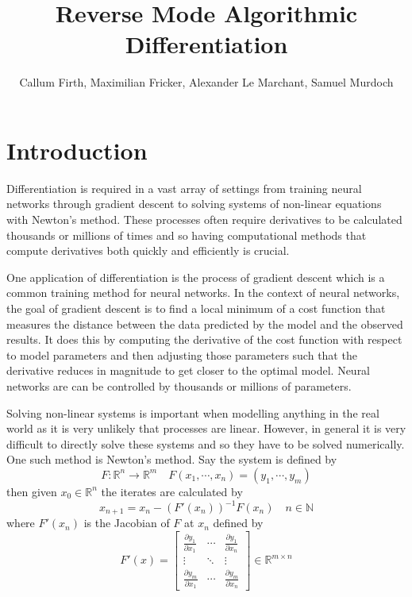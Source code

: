 \documentclass{article}
\title{Reverse Mode Algorithmic Differentiation}
\author{Callum Firth, Maximilian Fricker, Alexander Le Marchant, Samuel Murdoch} %
\date{}
\begin{document}
\maketitle

\tableofcontents
\newpage

\section{Introduction}

Differentiation is required in a vast array of settings from training neural networks through gradient descent to solving systems of non-linear equations with Newton's method. These processes often require derivatives to be calculated thousands or millions of times and so having computational methods that compute derivatives both quickly and efficiently is crucial.

One application of differentiation is the process of gradient descent which is a common training method for neural networks. In the context of neural networks, the goal of gradient descent is to find a local minimum of a cost function that measures the distance between the data predicted by the model and the observed results. It does this by computing the derivative of the cost function with respect to model parameters and then adjusting those parameters such that the derivative reduces in magnitude to get closer to the optimal model. Neural networks are can be controlled by thousands or millions of parameters.

Solving non-linear systems is important when modelling anything in the real world as it is very unlikely that processes are linear. However, in general it is very difficult to directly solve these systems and so they have to be solved numerically. One such method is Newton's method. Say the system is defined by
\begin{equation} \label{Fxy}
        F: \mathbb{R}^n \rightarrow \mathbb{R}^m \quad F(x_1, \cdots, x_n) = (y_1, \cdots, y_m)
\end{equation}
then given $x_0 \in \mathbb{R}^n$ the iterates are calculated by
\begin{equation*}
x_{n+1} = x_n - (F'(x_n))^{-1}F(x_n) \quad n \in \mathbb{N}
\end{equation*}
where $F'(x_n)$ is the Jacobian of $F$ at $x_n$ defined by
\begin{equation} \label{jacobian}
    F'(x) = \begin{bmatrix}
        \frac{\partial y_1}{\partial x_1} & \cdots & \frac{\partial y_1}{\partial x_n} \\
        \vdots & \ddots & \vdots \\
        \frac{\partial y_m}{\partial x_1} & \cdots & \frac{\partial y_m}{\partial x_n}
    \end{bmatrix} \in \mathbb{R}^{m \times n}
\end{equation}
\end{document}
